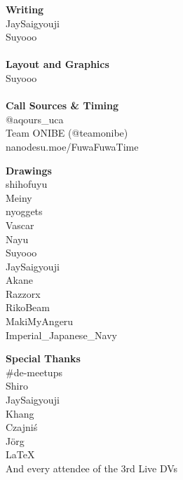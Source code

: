 \begin{multicols}{3}\footnotesize
\setlength{\columnseprule}{0pt}
\begin{center}
\textbf{Writing}\\JaySaigyouji\\Suyooo\\
~\\
\textbf{Layout and Graphics}\\Suyooo\\
~\\
\textbf{Call Sources \& Timing}\\@aqours\_uca\\Team ONIBE (@teamonibe)\\nanodesu.moe/FuwaFuwaTime
\end{center}
\columnbreak
\begin{center}
\textbf{Drawings}\\shihofuyu\\Meiny\\nyoggets\\Vascar\\Nayu\\Suyooo\\JaySaigyouji\\Akane\\Razzorx\\RikoBeam\\MakiMyAngeru\\Imperial\_Japanese\_Navy
\end{center}
\columnbreak
\begin{center}
\textbf{Special Thanks}\\\#de-meetups\\Shiro\\JaySaigyouji\\Khang\\Czajniś\\J\"org\\\LaTeX\\And every attendee of the 3rd Live DVs
\end{center}
\end{multicols}
\vspace{-6em}
\ifdefined\COMPLETE
\else
	
\fi
